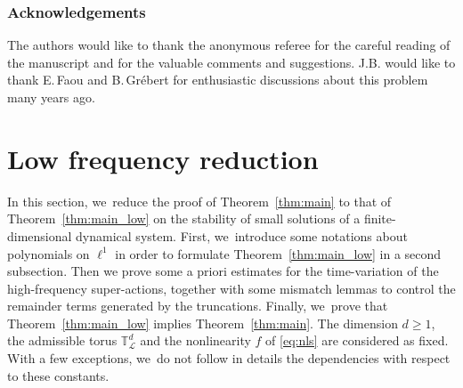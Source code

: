 \documentclass[10pt,a4paper]{amsart}
\theoremstyle{plain}
\theoremstyle{definition}
\newcommand{\1}{\mathbf{1}}
\begin{document}
\subsubsection*{Acknowledgements}
The authors would like to thank the anonymous referee for the careful reading of the manuscript and for the valuable comments and suggestions. J.B. would like to thank E.\,Faou and B.\,Grébert for enthusiastic discussions about this problem many years ago.

\section{Low frequency reduction}
\label{sec:low-freq}
In this section, we~reduce the proof of Theorem~\ref{thm:main} to that of Theorem~\ref{thm:main_low} on the stability of small solutions of a finite-dimensional dynamical system. First, we~introduce some notations about polynomials on $\ell^1$ in order to formulate Theorem~\ref{thm:main_low} in a second subsection. Then we prove some a priori estimates for the time-variation of the high-frequency super-actions, together with some mismatch lemmas to control the remainder terms generated by the truncations. Finally, we~prove that Theorem~\ref{thm:main_low} implies Theorem~\ref{thm:main}. The dimension $d\geq 1$, the admissible torus $\mathbb{T}^d_{\mathscr{L}}$ and the nonlinearity $f$ of \eqref{eq:nls} are considered as fixed. With a few exceptions, we~do not follow in details the dependencies with respect to these constants.
\end{document}
